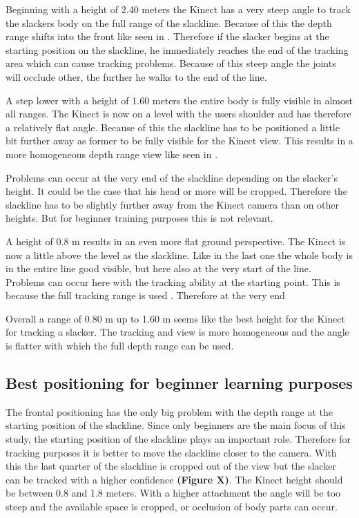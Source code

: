 Beginning with a height of 2.40 meters the Kinect has a very steep angle to track the slackers body on the full range of the slackline. Because of this the depth range shifts into the front like seen in \textbf{}. Therefore if the slacker begins at the starting position on the slackline, he immediately reaches the end of the tracking area which can cause tracking problems. Because of this steep angle the joints will occlude other, the further he walks to the end of the line.

A step lower with a height of 1.60 meters the entire body is fully visible in almost all ranges. The Kinect is now on a level with the users shoulder and has therefore a relatively flat angle. Because of this the slackline has to be positioned a little bit further away as former to be fully visible for the Kinect view. This results in a more homogeneous depth range view like seen in \textbf{}.

Problems can occur at the very end of the slackline depending on the slacker’s height. It could be the case that his head or more will be cropped. Therefore the slackline has to be slightly further away from the Kinect camera than on other heights. But for beginner training purposes this is not relevant.

A height of 0.8 m results in an even more flat ground perspective. The Kinect is now a little above the level as the slackline. Like in the last one the whole body is in the entire line good visible, but here also at the very start of the line. Problems can occur here with the tracking ability at the starting point. This is because the full tracking range is used \textbf{}. Therefore at the very end  

Overall a range of 0.80 m up to 1.60 m seems like the best height for the Kinect for tracking a slacker. The tracking and view is more homogeneous and the angle is flatter with which the full depth range can be used.

\subsection{Best positioning for beginner learning purposes}
The frontal positioning has the only big problem with the depth range at the starting position of the slackline. Since only beginners are the main focus of this study, the starting position of the slackline plays an important role. Therefore for tracking purposes it is better to move the slackline closer to the camera. With this the last quarter of the slackline is cropped out of the view but the slacker can be tracked with a higher confidence \textbf{(Figure X)}. The Kinect height should be between 0.8 and 1.8 meters. With a higher attachment the angle will be too steep and the available space is cropped, or occlusion of body parts can occur.

